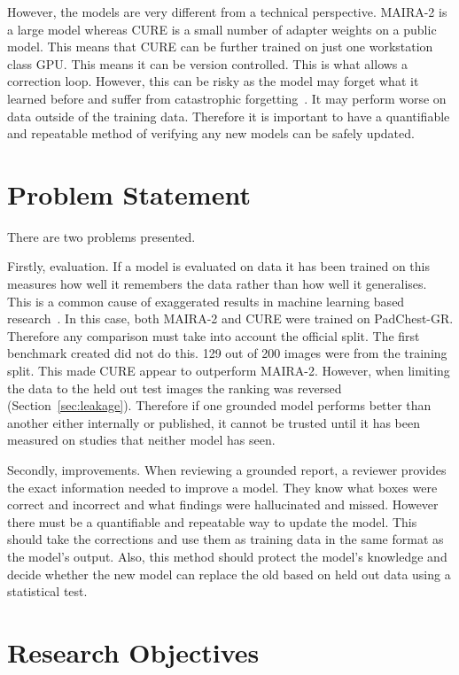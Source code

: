 However, the models are very different from a technical perspective. MAIRA-2 is a large
model whereas CURE is a small number of adapter weights on a public model. This means
that CURE can be further trained on just one workstation class GPU. This means it can
be version controlled. This is what allows a correction loop. However, this can be
risky as the model may forget what it learned before and suffer from catastrophic
forgetting~\cite{kirkpatrick2017forgetting}. It may perform worse on data outside of
the training data. Therefore it is important to have a quantifiable and repeatable
method of verifying any new models can be safely updated.

\section{Problem Statement}
\label{sec:problem}

There are two problems presented.

Firstly, evaluation. If a model is evaluated on data it has been trained on this
measures how well it remembers the data rather than how well it generalises. This is a
common cause of exaggerated results in machine learning based
research~\cite{kapoor2022leakage}. In this case, both MAIRA-2 and CURE were trained on
PadChest-GR. Therefore any comparison must take into account the official split. The
first benchmark created did not do this. 129 out of 200 images were from the training
split. This made CURE appear to outperform MAIRA-2. However, when limiting the data to
the held out test images the ranking was reversed (Section~\ref{sec:leakage}).
Therefore if one grounded model performs better than another either internally or
published, it cannot be trusted until it has been measured on studies that neither
model has seen.

Secondly, improvements. When reviewing a grounded report, a reviewer provides the exact
information needed to improve a model. They know what boxes were correct and incorrect
and what findings were hallucinated and missed. However there must be a quantifiable
and repeatable way to update the model. This should take the corrections and use them
as training data in the same format as the model's output. Also, this method should
protect the model's knowledge and decide whether the new model can replace the old
based on held out data using a statistical test.

\section{Research Objectives}
\label{sec:objectives}

